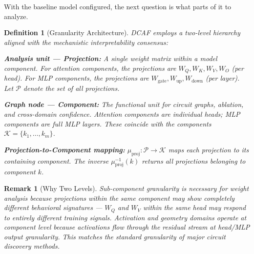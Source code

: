 \documentclass[11pt]{article}
\newtheorem{definition}{Definition}[section]
\newtheorem{remark}{Remark}[section]
\begin{document}
With the baseline model configured, the next question is what parts of it to analyze.

\begin{definition}[Granularity Architecture]
\label{def:granularity}
DCAF employs a two-level hierarchy aligned with the mechanistic interpretability consensus:

\textbf{Analysis unit --- Projection:} A single weight matrix within a model component. For attention components, the projections are $W_Q, W_K, W_V, W_O$ (per head). For MLP components, the projections are $W_{\text{gate}}, W_{\text{up}}, W_{\text{down}}$ (per layer). Let $\mathcal{P}$ denote the set of all projections.

\textbf{Graph node --- Component:} The functional unit for circuit graphs, ablation, and cross-domain confidence. Attention components are individual heads; MLP components are full MLP layers. These coincide with the components $\mathcal{K} = \{k_1, \ldots, k_m\}$.

\textbf{Projection-to-Component mapping:} $\mu_{\text{proj}}: \mathcal{P} \to \mathcal{K}$ maps each projection to its containing component. The inverse $\mu_{\text{proj}}^{-1}(k)$ returns all projections belonging to component $k$.
\end{definition}

\begin{remark}[Why Two Levels]
\label{rem:why-two-levels}
Sub-component granularity is necessary for weight analysis because projections within the same component may show completely different behavioral signatures --- $W_Q$ and $W_V$ within the same head may respond to entirely different training signals. Activation and geometry domains operate at component level because activations flow through the residual stream at head/MLP output granularity. This matches the standard granularity of major circuit discovery methods.
\end{remark}
\end{document}

